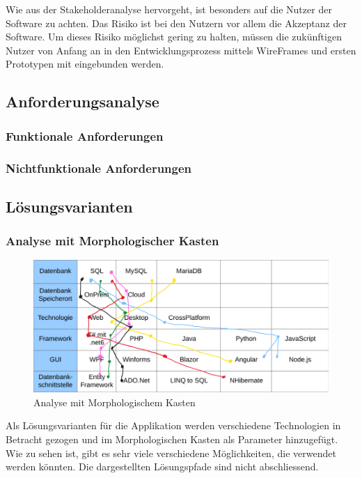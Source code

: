 Wie aus der Stakeholderanalyse hervorgeht, ist besonders auf die Nutzer der Software zu achten. Das Risiko ist bei den Nutzern vor allem die Akzeptanz der Software. Um dieses Risiko möglichst gering zu halten, müssen die zukünftigen Nutzer von Anfang an in den Entwicklungsprozess mittels WireFrames und ersten Prototypen mit eingebunden werden.

\subsection{Anforderungsanalyse}
\subsubsection{Funktionale Anforderungen}


\subsubsection{Nichtfunktionale Anforderungen}


\subsection{Lösungsvarianten}
\subsubsection{Analyse mit Morphologischer Kasten}
\begin{figure}[H]
  \begin{center}
    \includegraphics[width=1\linewidth]{content/images/morphoKasten.png}
    \caption{Analyse mit Morphologischem Kasten}
    \label{morphoKasten}
  \end{center}
\end{figure}

Als Lösungsvarianten für die Applikation werden verschiedene Technologien in Betracht gezogen und im Morphologischen Kasten als Parameter hinzugefügt. Wie zu sehen ist, gibt es sehr viele verschiedene Möglichkeiten, die verwendet werden könnten. Die dargestellten Lösungspfade sind nicht abschliessend.

